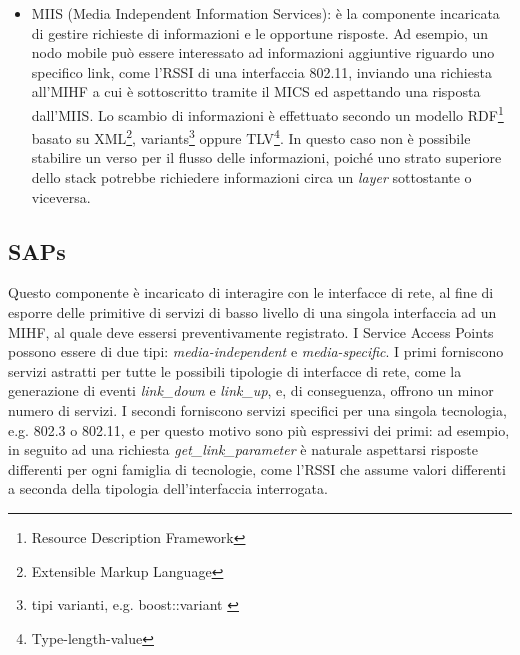 \begin{itemize}
\item MIIS (Media Independent Information Services): è la componente incaricata di gestire richieste di informazioni e le opportune risposte. Ad esempio, un nodo mobile può essere interessato ad informazioni aggiuntive riguardo uno specifico link, come l'RSSI di una interfaccia 802.11, inviando una richiesta all'MIHF a cui è sottoscritto tramite il MICS ed aspettando una risposta dall'MIIS. Lo scambio di informazioni è effettuato secondo un modello RDF\footnote{Resource Description Framework} basato su XML\footnote{Extensible Markup Language}, variants\footnote{tipi varianti, e.g. boost::variant \cite{variants}} oppure TLV\footnote{Type-length-value}. In questo caso non è possibile stabilire un verso per il flusso delle informazioni, poiché uno strato superiore dello stack potrebbe richiedere informazioni circa un {\em layer} sottostante o viceversa.
\end{itemize}

\subsection{SAPs}
Questo componente è incaricato di interagire con le interfacce di rete, al fine di esporre delle primitive di servizi di basso livello di una singola interfaccia ad un MIHF, al quale deve essersi preventivamente registrato.
I Service Access Points possono essere di due tipi: {\em media-independent} e {\em media-specific}.
I primi forniscono servizi astratti per tutte le possibili tipologie di interfacce di rete, come la generazione di eventi {\em link\_down} e {\em link\_up}, e, di conseguenza, offrono un minor numero di servizi.
I secondi forniscono servizi specifici per una singola tecnologia, e.g. 802.3 o 802.11, e per questo motivo sono più espressivi dei primi: ad esempio, in seguito ad una richiesta {\em get\_link\_parameter} è naturale aspettarsi risposte differenti per ogni famiglia di tecnologie, come l'RSSI che assume valori differenti a seconda della tipologia dell'interfaccia interrogata. 

